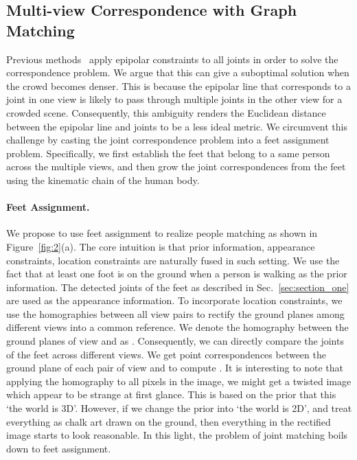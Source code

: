 \documentclass[runningheads]{llncs}
\begin{document}
\subsection{Multi-view Correspondence with Graph Matching}
\label{sec:section_two}
Previous methods~\cite{Authors26,kadkhodamohammadi2018generalizable} apply epipolar constraints to all joints in order to solve the correspondence problem. We argue that this can give a suboptimal solution when the crowd becomes denser. This is because the epipolar line that corresponds to a joint in one view is likely to pass through multiple joints in the other view for a crowded scene. Consequently, this ambiguity renders the Euclidean distance between the epipolar line and joints to be a less ideal metric.
We circumvent this challenge by casting the joint correspondence problem into a feet assignment problem. Specifically, we first establish the feet that belong to a same person across the multiple views, and then grow the joint correspondences from the feet using the kinematic chain of the human body.  

\paragraph{\bf{Feet Assignment.}}
We propose to use feet assignment to realize people matching as shown in Figure~\ref{fig:2}(a). 
The core intuition is that prior information, appearance constraints, location constraints are naturally fused in such setting. We use the fact that at least one foot is on the ground when a person is walking
as the prior information. The detected joints of the feet as described in Sec.~\ref{sec:section_one} are used as the appearance information. To incorporate location constraints, we use the homographies between all view pairs to rectify the ground planes among different views into a common reference. We denote the homography between the ground planes of view  and  as . Consequently, we can directly compare the joints of the feet across different views. We get  point correspondences between the ground plane of each pair of view  and  to compute .
It is interesting to note that applying the homography to all pixels in the image, we might get a twisted image which appear to be strange at first glance. This is based on the prior that this `the world is 3D'. However, if we change the prior into `the world is 2D', and treat everything as chalk art drawn on the ground, then everything in the rectified image starts to look reasonable. In this light, the problem of joint matching boils down to feet assignment.
\end{document}
